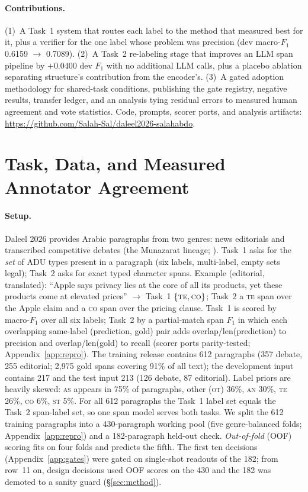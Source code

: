 \documentclass[11pt]{article}
\newcommand{\lab}[1]{\textsc{#1}}
\newcommand{\co}{\lab{co}}
\newcommand{\as}{\lab{as}}
\newcommand{\te}{\lab{te}}
\newcommand{\st}{\lab{st}}
\newcommand{\an}{\lab{an}}
\newcommand{\ot}{\lab{ot}}
\begin{document}
\paragraph{Contributions.} (1)~A Task~1 system that routes each label to
the method that measured best for it, plus a verifier for the one label
whose problem was precision (dev macro-$F_1$ 0.6159 $\rightarrow$
0.7089). (2)~A Task~2 re-labeling stage that improves an LLM span
pipeline by $+0.0400$ dev $F_1$ with no additional LLM calls, plus a
placebo ablation separating structure's contribution from the
encoder's. (3)~A gated adoption methodology for shared-task
conditions, publishing the gate registry, negative results, transfer
ledger, and an analysis tying residual errors to measured human
agreement and vote statistics. Code, prompts, scorer ports, and
analysis artifacts:
\url{https://github.com/Salah-Sal/daleel2026-salahabdo}.

\section{Task, Data, and Measured Annotator Agreement}
\label{sec:task}

\paragraph{Setup.} Daleel 2026 \citep{nabhani-etal-2026-daleel} provides
Arabic paragraphs from two genres: news editorials and transcribed
competitive debates (the Munazarat lineage;
\citealp{khader-etal-2024-munazarat,alsharafi-etal-2025-arabic}). Task~1
asks for the \emph{set} of ADU types present in a paragraph (six labels,
multi-label, empty sets legal); Task~2 asks for exact typed character
spans. Example (editorial, translated): ``Apple says privacy lies at the
core of all its products, yet these products come at elevated prices''
$\rightarrow$ Task~1 $\{\te,\co\}$; Task~2 a \te{} span over the Apple
claim and a \co{} span over the pricing clause. Task~1 is scored by
macro-$F_1$ over all six labels; Task~2 by a partial-match span $F_1$ in
which each overlapping same-label (prediction, gold) pair adds
overlap/len(prediction) to precision and overlap/len(gold) to recall
(scorer ports parity-tested; Appendix~\ref{app:repro}). The training
release contains 612 paragraphs (357 debate, 255 editorial; 2{,}975 gold
spans covering 91\% of all text); the development input contains 217 and
the test input 213 (126 debate, 87 editorial). Label priors are heavily skewed: \as{} appears in
75\% of paragraphs, other (\ot) 36\%, \an{} 30\%, \te{} 26\%, \co{} 6\%, \st{}
5\%. For all 612 paragraphs the Task~1 label set equals the Task~2
span-label set, so one span model serves both tasks. We split the 612
training paragraphs into a 430-paragraph working pool (five
genre-balanced folds; Appendix~\ref{app:repro}) and a 182-paragraph
held-out check. \emph{Out-of-fold} (OOF) scoring fits on four folds and
predicts the fifth. The first ten decisions (Appendix~\ref{app:gates})
were gated on single-shot readouts of the 182; from row~11 on, design
decisions used OOF scores on the 430 and the 182 was demoted to a
sanity guard (\S\ref{sec:method}).
\end{document}
